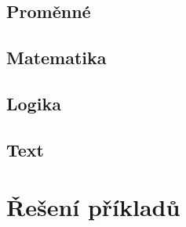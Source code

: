 \subsection*{Proměnné }
\begin{itemize}
	\blockVariableCreate
	\blockVariableChange
	\blockVariableGet
	\blockVariableSet
\end{itemize}

\subsection*{Matematika }
\begin{itemize}
	\blockMathOperation
	\blockMathTest
	\blockMathValue
	\blockMathConstant
	\blockMathRandom
\end{itemize}

\subsection*{Logika }
\begin{itemize}
	\blockLogicTrue
	\blockLogicFalse
	\blockLogicIf
	\blockLogicIfElse
	\blockLogicComparison
	\blockLogicOperator
\end{itemize}

\subsection*{Text }
\begin{itemize}
	\blockString
	\blockDisplayPrint
	\blockDisplayClear
\end{itemize}

\newpage

\section{Řešení příkladů}\label{cha:sol}

\printsolutions

\newpage

\nocite{*}
\printbibliography[title={Zdroje}]

